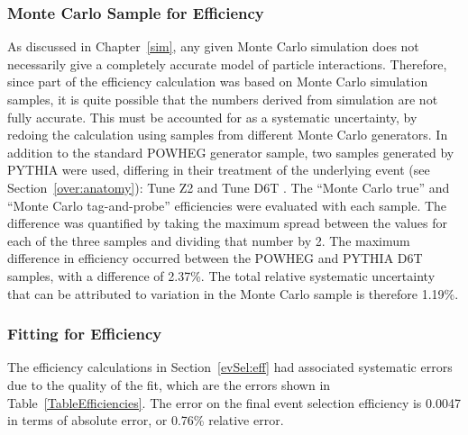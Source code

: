 \subsubsection{Monte Carlo Sample for Efficiency}
\label{anMeth:SystsOtherMCEff}


As discussed in Chapter~\ref{sim}, 
any given Monte Carlo simulation 
does not necessarily give a completely accurate 
model of particle interactions.  %
Therefore, since part of the efficiency calculation 
was based on Monte Carlo simulation samples, 
it is quite possible that the numbers 
derived from simulation are not fully 
accurate.  
This must be accounted for as a systematic 
uncertainty, %
by redoing the calculation using samples 
from different Monte Carlo generators.  
In addition to the standard POWHEG generator 
sample, 
two samples generated by PYTHIA were used, 
differing in their treatment of the underlying event
(see Section~\ref{over:anatomy}): 
Tune Z2 \cite{TuneZ2} 
and Tune D6T \cite{TuneD6T}.  
The ``Monte Carlo true'' and ``Monte Carlo tag-and-probe'' 
efficiencies were evaluated with each sample.  
The difference was quantified by taking the 
maximum spread between the values for each of the 
three samples 
and dividing that number by 2.  
The maximum difference in efficiency occurred 
between the POWHEG and PYTHIA D6T samples, 
with a difference of 2.37\%.  
The total relative systematic uncertainty that can be 
attributed to variation in the Monte Carlo 
sample is therefore 1.19\%.  



\subsubsection{Fitting for Efficiency}
\label{anMeth:SystsOtherFitEff}


The efficiency calculations in Section~\ref{evSel:eff} 
had associated systematic errors due to the 
quality 
of the fit, 
which are the errors shown in Table~\ref{TableEfficiencies}.  
The error on the final event selection 
efficiency is 0.0047 in terms of absolute error, 
or 0.76\% relative error.  



